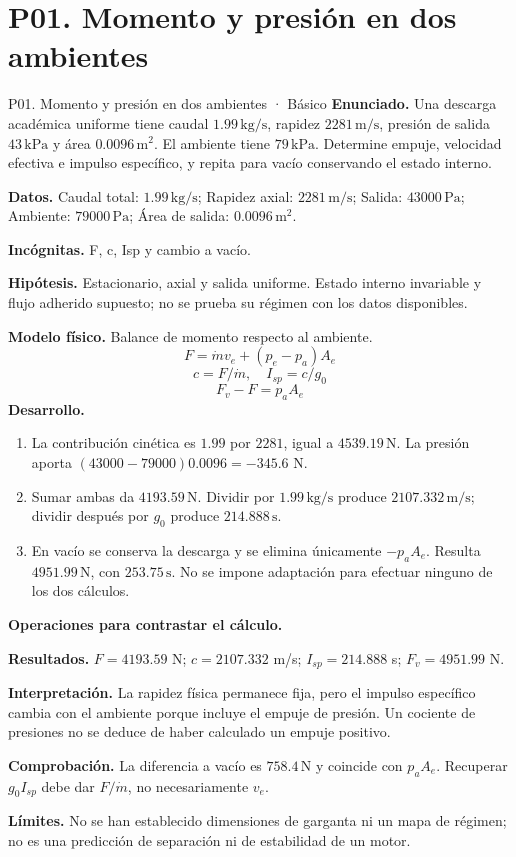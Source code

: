\section{P01. Momento y presión en dos ambientes}
\begin{studiumworked}{P01. Momento y presión en dos ambientes · Básico}
\textbf{Enunciado.} Una descarga académica uniforme tiene caudal $1.99\,\mathrm{kg/s}$, rapidez $2281\,\mathrm{m/s}$, presión de salida $43\,\mathrm{kPa}$ y área $0.0096\,\mathrm{m^2}$. El ambiente tiene $79\,\mathrm{kPa}$. Determine empuje, velocidad efectiva e impulso específico, y repita para vacío conservando el estado interno.

\textbf{Datos.} Caudal total: $1.99\,\mathrm{kg/s}$; Rapidez axial: $2281\,\mathrm{m/s}$; Salida: $43000\,\mathrm{Pa}$; Ambiente: $79000\,\mathrm{Pa}$; Área de salida: $0.0096\,\mathrm{m^2}$.

\textbf{Incógnitas.} F, c, Isp y cambio a vacío.

\textbf{Hipótesis.} Estacionario, axial y salida uniforme. Estado interno invariable y flujo adherido supuesto; no se prueba su régimen con los datos disponibles.

\textbf{Modelo físico.} Balance de momento respecto al ambiente.
\[F=\dot m v_e+(p_e-p_a)A_e\]
\[c=F/\dot m,\quad I_{sp}=c/g_0\]
\[F_v-F=p_aA_e\]
\textbf{Desarrollo.}
\begin{enumerate}
\item La contribución cinética es $1.99$ por $2281$, igual a $4539.19\,\mathrm{N}$. La presión aporta $(43000-79000)0.0096=-345.6$ N.
\item Sumar ambas da $4193.59\,\mathrm{N}$. Dividir por $1.99\,\mathrm{kg/s}$ produce $2107.332\,\mathrm{m/s}$; dividir después por $g_0$ produce $214.888\,\mathrm{s}$.
\item En vacío se conserva la descarga y se elimina únicamente $-p_aA_e$. Resulta $4951.99\,\mathrm{N}$, con $253.75\,\mathrm{s}$. No se impone adaptación para efectuar ninguno de los dos cálculos.
\end{enumerate}
\textbf{Operaciones para contrastar el cálculo.}

\textbf{Resultados.} $F=4193.59$ N; $c=2107.332$ m/s; $I_{sp}=214.888$ s; $F_v=4951.99$ N.

\textbf{Interpretación.} La rapidez física permanece fija, pero el impulso específico cambia con el ambiente porque incluye el empuje de presión. Un cociente de presiones no se deduce de haber calculado un empuje positivo.

\textbf{Comprobación.} La diferencia a vacío es $758.4\,\mathrm{N}$ y coincide con $p_aA_e$. Recuperar $g_0I_{sp}$ debe dar $F/\dot m$, no necesariamente $v_e$.

\textbf{Límites.} No se han establecido dimensiones de garganta ni un mapa de régimen; no es una predicción de separación ni de estabilidad de un motor.
\end{studiumworked}
